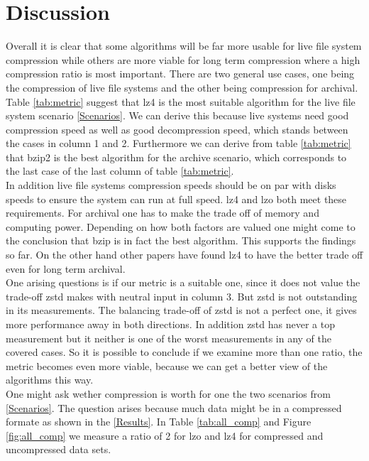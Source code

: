 \documentclass[
	12pt,
	a4paper,
	BCOR10mm,
	DIV14,
	listof=totoc,
	bibliography=totoc,
	headsepline
]{scrreprt}
\begin{document}
\FloatBarrier
	
\chapter{Discussion}
\label{Discussion}
Overall it is clear that some algorithms will be far more usable for live file system compression while others are more viable for long term compression where a high compression ratio is most important.
There are two general use cases, one being the compression of live file systems and the other being compression for archival.
\\
Table \ref{tab:metric} suggest that lz4 is the most suitable algorithm for the live file system scenario \ref{Scenarios}.
We can derive this because live systems need good compression speed as well as good decompression speed, which stands between the cases in column 1 and 2.
Furthermore we can derive from table \ref{tab:metric} that bzip2 is the best algorithm for the archive scenario, which corresponds to the last case of the last column of table \ref{tab:metric}.
\\
In addition live file systems compression speeds should be on par with disks speeds to ensure the system can run at full speed.
lz4 and lzo both meet these requirements.
For archival one has to make the trade off of memory and computing power. 
Depending on how both factors are valued one might come to the conclusion that bzip is in fact the best algorithm. 
This supports the findings so far.
On the other hand other papers have found lz4 to have the better trade off even for long term archival\cite{PPerfHPC}.
\\
One arising questions is if our metric is a suitable one, since it does not value the trade-off zstd makes with neutral input in column 3.
But zstd is not outstanding in its measurements.
The balancing trade-off of zstd is not a perfect one, it gives more performance away in both directions.
In addition zstd has never a top measurement but it neither is one of the worst measurements in any of the covered cases.
So it is possible to conclude if we examine more than one ratio, the metric becomes even more viable, because we can get a better view of the algorithms this way.
\\
One might ask wether compression is worth for one the two scenarios from \ref{Scenarios}.
The question arises because much data might be in a compressed formate as shown in the \ref{Results}.
In Table \ref{tab:all_comp} and Figure \ref{fig:all_comp} we measure a ratio of 2 for lzo and lz4 for compressed and uncompressed data sets.
\end{document}
